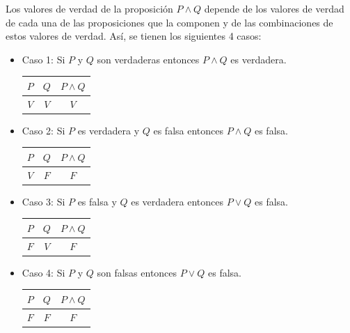 \documentclass[letterpaper, twoside]{article}
\begin{document}
\newpage

Los valores de verdad de la proposición $P\land Q$ depende de los valores de verdad de cada una de las proposiciones que la componen y de las combinaciones de estos valores de verdad. Así, se tienen los siguientes 4 casos:

\begin{itemize}
  \item Caso 1: Si $P$ y $Q$ son verdaderas entonces $P\land Q$ es verdadera.
  \vspace{.5cm}
  \begin{center}
    \begin{tabular}{|c|c|c|}
    \hline
    $P$ & $Q$ & $P\land Q$ \\ \hline
    $V$ & $V$ & $V$\\
    \hline
  \end{tabular}
  \end{center}
\vspace{.7cm}
  \item Caso 2: Si $P$ es verdadera y $Q$ es falsa entonces $P\land Q$ es falsa.
  \vspace{.5cm}
  \begin{center}
    \begin{tabular}{|c|c|c|}
    \hline
    $P$ & $Q$ & $P\land Q$ \\ \hline
    $V$ & $F$ & $F$\\
    \hline
  \end{tabular}
  \end{center}
\vspace{.7cm}
  \item Caso 3: Si $P$ es falsa y $Q$ es verdadera entonces $P\lor Q$ es falsa.
  \vspace{.5cm}
  \begin{center}
    \begin{tabular}{|c|c|c|}
    \hline
    $P$ & $Q$ & $P\land Q$ \\ \hline
    $F$ & $V$ & $F$\\
    \hline
  \end{tabular}
  \end{center}
\vspace{.7cm}
  \item Caso 4: Si $P$ y $Q$ son falsas entonces $P\lor Q$ es falsa.
  \vspace{.5cm}
  \begin{center}
    \begin{tabular}{|c|c|c|}
    \hline
    $P$ & $Q$ & $P\land Q$ \\ \hline
    $F$ & $F$ & $F$\\
    \hline
  \end{tabular}
  \end{center}

\end{itemize}
\end{document}
